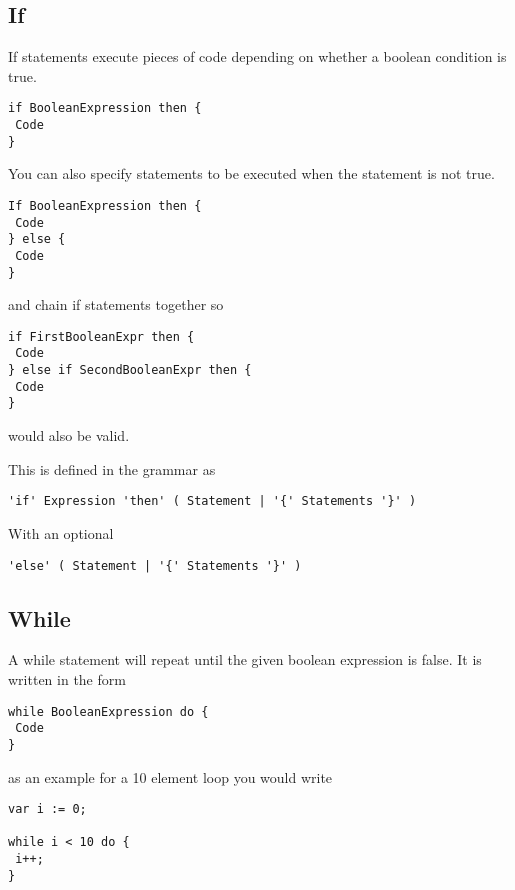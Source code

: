 \documentclass[]{final_report}
\begin{document}
\subsection{If}

If statements execute pieces of code depending on whether a boolean condition is true.

\begin{verbatim}
if BooleanExpression then {
 Code
}
\end{verbatim}

You can also specify statements to be executed when the statement is not true.

\begin{verbatim}
If BooleanExpression then {
 Code
} else {
 Code 
}
\end{verbatim}

and chain if statements together so

\begin{verbatim}
if FirstBooleanExpr then {
 Code
} else if SecondBooleanExpr then {
 Code
}
\end{verbatim}

would also be valid.

This is defined in the grammar as  

\begin{verbatim}
'if' Expression 'then' ( Statement | '{' Statements '}' )
\end{verbatim}

With an optional
\begin{verbatim}
'else' ( Statement | '{' Statements '}' )
\end{verbatim}


\subsection{While}

A while statement will repeat until the given boolean expression is false. It is written in the form

\begin{verbatim}
while BooleanExpression do {
 Code
}
\end{verbatim}

as an example for a 10 element loop you would write

\begin{verbatim}
var i := 0;

while i < 10 do {
 i++;
}
\end{verbatim}
\end{document}
